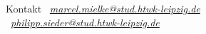 \documentclass[10pt]{beamer}
\begin{document}
\begin{frame}{Kontakt}
	\Large
	\Letter\, \textsl{\href{mailto:marcel.mielke@stud.htwk-leipzig.de}{marcel.mielke@stud.htwk-leipzig.de}}\bigskip\\
	\Letter\, \textsl{\href{mailto:philipp.sieder@stud.htwk-leipzig.de}{philipp.sieder@stud.htwk-leipzig.de}}
	
\end{frame}


\end{document}
